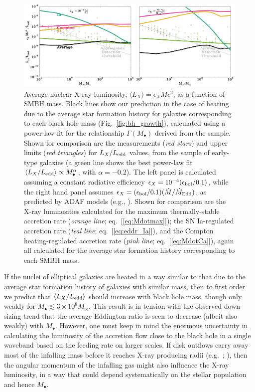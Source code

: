 \documentclass[usenatbib,fleqn]{mn2e}
\newcommand{\Mdot}{\dot{M}}
\newcommand{\MdotEdd}{\dot{M}_{\rm Edd}}
\begin{document}
\begin{figure}
\includegraphics[width=\textwidth]{miller.pdf}
\caption{\label{fig:miller} Average nuclear X-ray luminosity, $\langle L_X \rangle = \epsilon_X \Mdot c^2$, as a function of SMBH mass.  Black lines show our prediction in the case of heating due to the average star formation history for galaxies corresponding to each black hole mass (Fig.~\ref{fig:bh_growth}), calculated using a power-law fit for the relationship  $\Gamma(M_{\bullet})$ derived from the \citet{LauerFaber+:2007a} sample.  Shown for comparison are the measurements ({\it red stars}) and
  upper limits ({\it red triangles}) for $L_X/L_{\rm edd}$ values, from the \citet{Miller+15} sample of early-type galaxies (a green line shows the best power-law fit $\langle L_X/L_{\rm edd}\rangle \propto M_{\bullet}^{\alpha}$, with $\alpha = -0.2$).  The left panel is calculated assuming a constant radiative efficiency $\epsilon_X=10^{-4} (\epsilon_{\rm bol}/0.1)$, while the right hand panel assumes $\epsilon_X=
  (\epsilon_{\rm bol}/0.1)(\Mdot/\MdotEdd)$, as predicted by ADAF models (e.g., \citealt{Narayan&Yi95}).  Shown for comparison are the X-ray luminosities calculated for the maximum thermally-stable accretion rate ({\it orange line}; eq.~[\ref{eq:Mdotmax}]); the SN Ia-regulated accretion rate ({\it teal line}; eq.~[\ref{eq:eddr_Ia}]), and the Compton heating-regulated accretion rate  ({\it pink line}; eq.~[\ref{eq:MdotCa}]),  again all calculated for the average star formation history corresponding to each SMBH mass.}
\end{figure}

If the nuclei of elliptical galaxies are heated in a way similar to that due to the average star formation history of galaxies with
similar mass, then to first order we predict that $\langle
L_{X}/L_{\rm edd}\rangle$ should increase with black hole mass, though
only weakly for $M_{\bullet} \lesssim 3\times 10^{8}M_{\odot}$.  This
result is in tension with the observed down-sizing trend that the
average Eddington ratio is seen to decrease (albeit also weakly)
with $M_{\bullet}$.  However, one must keep in mind the enormous uncertainty in calculating the
luminosity of the accretion flow close to the black hole in a single
waveband based on the feeding rate on larger scales.  If disk outflows carry away most of the infalling mass before it reaches X-ray producing radii (e.g.~\citealt{Blandford&Begelman99}; \citealt{Li+13}), then the
angular momentum of the infalling gas might also influence the X-ray luminosity, in a way
that could depend systematically on the stellar population and hence $M_{\bullet}$.
\end{document}
